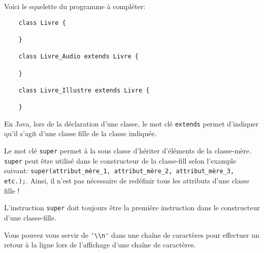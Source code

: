 \begin{Exercice}[20 minutes]
Voici le squelette du programme à compléter:

\begin{lstlisting}
	class Livre {

	}

	class Livre_Audio extends Livre {

	}

	class Livre_Illustre extends Livre {

	}\end{lstlisting}

\begin{conseil}
En Java, lors de la déclaration d'une classe, le mot clé \lstinline{extends} permet d'indiquer qu'il s'agit d'une classe fille de la classe indiquée. 

Le mot clé \lstinline{super} permet à la sous classe d'hériter d'éléments de la classe-mère. \lstinline{super} peut être utilisé dans le constructeur de la classe-fill selon l'example suivant: \lstinline{super(attribut_mère_1, attribut_mère_2, attribut_mère_3, etc.);}. Ainsi, il n'est pas nécessaire de redéfinir tous les attributs d'une classe fille !

L'instruction \lstinline{super} doit toujours être la première instruction dans le constructeur d'une classe-fille.

Vous pouvez vous servir de \lstinline{'\\n'} dans une chaîne de caractères pour effectuer un retour à la ligne lors de l'affichage d'une chaîne de caractères.
\end{conseil}

\begin{solution}
	
\end{solution}

\end{Exercice}

